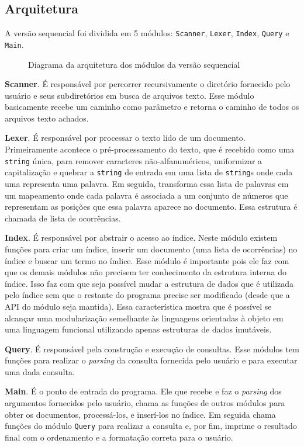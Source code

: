 \subsection{Arquitetura}

A versão sequencial foi dividida em 5 módulos: \verb|Scanner|, \verb|Lexer|, \verb|Index|, \verb|Query| e \verb|Main|.

\begin{figure}[h]
 \centering
 \def\svgwidth{0.5\columnwidth}
 
 \caption{Diagrama da arquitetura dos módulos da versão sequencial}
\end{figure}

\textbf{Scanner}. É responsável por percorrer recursivamente o diretório fornecido pelo usuário e seus subdiretórios em busca de arquivos texto. Esse módulo basicamente recebe um caminho como parâmetro e retorna o caminho de todos os arquivos texto achados.

\textbf{Lexer}. É responsável por processar o texto lido de um documento. Primeiramente acontece o pré-processamento do texto, que é recebido como uma \verb|string| única, para remover caracteres não-alfanuméricos, uniformizar a capitalização e quebrar a \verb|string| de entrada em uma lista de \verb|string|s onde cada uma representa uma palavra. Em seguida, transforma essa lista de palavras em um mapeamento onde cada palavra é associada a um conjunto de números que representam as posições que essa palavra aparece no documento. Essa estrutura é chamada de lista de ocorrências.

\textbf{Index}. É responsável por abstrair o acesso ao índice. Neste módulo existem funções para criar um índice, inserir um documento (uma lista de ocorrências) no índice e buscar um termo no índice. Esse módulo é importante pois ele faz com que os demais módulos não precisem ter conhecimento da estrutura interna do índice. Isso faz com que seja possível mudar a estrutura de dados que é utilizada pelo índice sem que o restante do programa precise ser modificado (desde que a API do módulo seja mantida). Essa característica mostra que é possível se alcançar uma modularização semelhante às linguagens orientadas à objeto em uma linguagem funcional utilizando apenas estruturas de dados imutáveis.

\textbf{Query}. É responsável pela construção e execução de consultas. Esse módulos tem funções para realizar o \emph{parsing} da consulta fornecida pelo usuário e para executar uma dada consulta.

\textbf{Main}. É o ponto de entrada do programa. Ele que recebe e faz o \emph{parsing} dos argumentos fornecidos pelo usuário, chama as funções de outros módulos para obter os documentos, processá-los, e inserí-los no índice. Em seguida chama funções do módulo \verb|Query| para realizar a consulta e, por fim, imprime o resultado final com o ordenamento e a formatação correta para o usuário.


